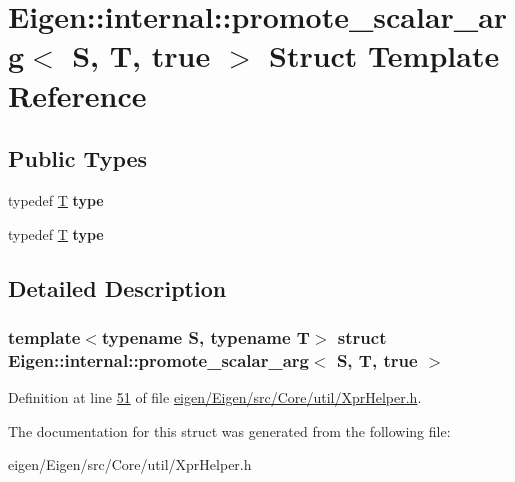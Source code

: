 \hypertarget{struct_eigen_1_1internal_1_1promote__scalar__arg_3_01_s_00_01_t_00_01true_01_4}{}\section{Eigen\+:\+:internal\+:\+:promote\+\_\+scalar\+\_\+arg$<$ S, T, true $>$ Struct Template Reference}
\label{struct_eigen_1_1internal_1_1promote__scalar__arg_3_01_s_00_01_t_00_01true_01_4}
\subsection*{Public Types}
\begin{DoxyCompactItemize}
\item 
\mbox{\label{struct_eigen_1_1internal_1_1promote__scalar__arg_3_01_s_00_01_t_00_01true_01_4_ad735bb85aee92d74e50b13817d834cdb}} 
typedef \hyperlink{group___sparse_core___module}{T} {\bfseries type}
\item 
\mbox{\label{struct_eigen_1_1internal_1_1promote__scalar__arg_3_01_s_00_01_t_00_01true_01_4_ad735bb85aee92d74e50b13817d834cdb}} 
typedef \hyperlink{group___sparse_core___module}{T} {\bfseries type}
\end{DoxyCompactItemize}


\subsection{Detailed Description}
\subsubsection*{template$<$typename S, typename T$>$\newline
struct Eigen\+::internal\+::promote\+\_\+scalar\+\_\+arg$<$ S, T, true $>$}



Definition at line \hyperlink{eigen_2_eigen_2src_2_core_2util_2_xpr_helper_8h_source_l00051}{51} of file \hyperlink{eigen_2_eigen_2src_2_core_2util_2_xpr_helper_8h_source}{eigen/\+Eigen/src/\+Core/util/\+Xpr\+Helper.\+h}.



The documentation for this struct was generated from the following file\+:\begin{DoxyCompactItemize}
\item 
eigen/\+Eigen/src/\+Core/util/\+Xpr\+Helper.\+h\end{DoxyCompactItemize}
